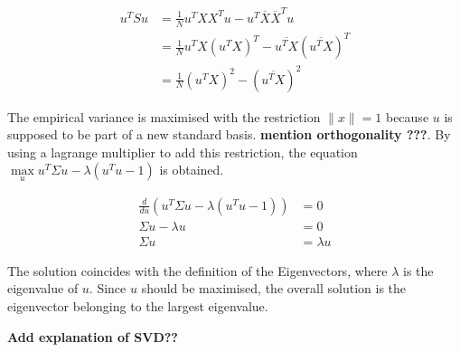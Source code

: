 \documentclass[a4paper, 11pt]{article}
\begin{document}
\begin{align*}
u^T S u & = \frac{1}{N} u^T X X^T u - u^T \overline{X} \overline{X}^T u \\
& = \frac{1}{N} u^T X (u^T X)^T  -  \overline{u^TX} (\overline{u^TX})^T  \\
& = \frac{1}{N} (u^T X)^2 - (\overline{u^TX})^2
\end{align*}

The empirical variance is maximised with the restriction $\parallel x \parallel = 1$ because $u$ is supposed to be part of a new standard basis. \textbf{mention orthogonality ???}. By using a lagrange multiplier to add this restriction, the equation $\max\limits_{u} u^T \Sigma u - \lambda(u^T u - 1)$ is obtained.

\begin{align*}
 \frac{d}{du} (u^T \Sigma u - \lambda(u^T u - 1)) & = 0 \\
 \Sigma u - \lambda u & = 0 \\
 \Sigma u & = \lambda u 
\end{align*}

The solution coincides with the definition of the Eigenvectors, where $\lambda$ is the eigenvalue of $u$. Since $u$ should be maximised, the overall solution is the eigenvector belonging to the largest eigenvalue.

\textbf{Add explanation of SVD??}
\end{document}
